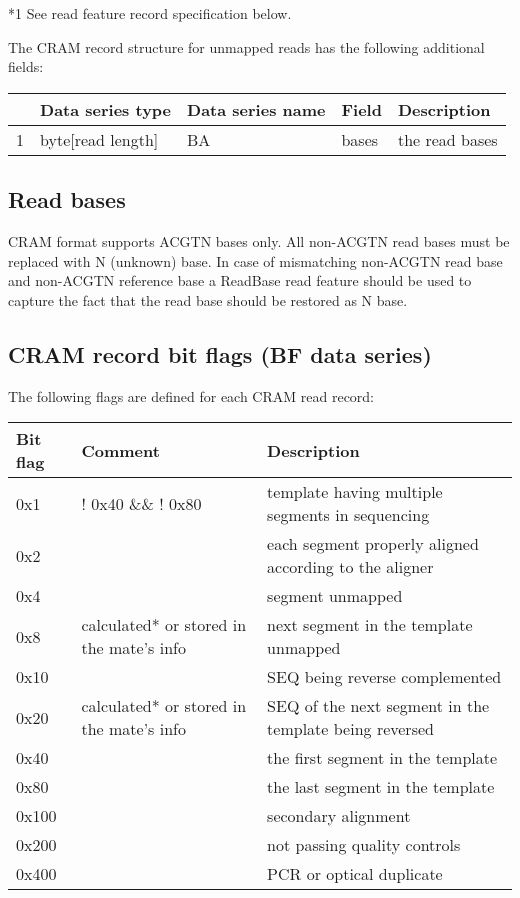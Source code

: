 \documentclass[a4paper]{article}
\begin{document}
*1 See read feature record specification below.

The CRAM record structure for unmapped reads has the following additional fields:

\begin{tabular}{|>{\raggedright}p{8pt}|>{\raggedright}p{88pt}|>{\raggedright}p{83pt}|>{\raggedright}p{85pt}|>{\raggedright}p{178pt}|}
\hline
 & \textbf{Data series type} & \textbf{Data series name} & \textbf{Field} & \textbf{Description}\tabularnewline
\hline
1 & byte[read length] & BA & bases & the read bases\tabularnewline
\hline
\end{tabular}

\subsection{\textbf{Read bases}}

CRAM format supports ACGTN bases only. All non-ACGTN read bases must be replaced 
with N (unknown) base. In case of mismatching non-ACGTN read base and non-ACGTN 
reference base a ReadBase read feature should be used to capture the fact that 
the read base should be restored as N base. 

\subsection{\textbf{CRAM record bit flags (BF data series)}}

The following flags are defined for each CRAM read record:

\begin{tabular}{|>{\raggedright}p{144pt}|>{\raggedright}p{144pt}|>{\raggedright}p{144pt}|}
\hline
\textbf{Bit flag} & \textbf{Comment} & \textbf{Description}\tabularnewline
\hline
0x1 & ! 0x40 \&\& ! 0x80 & template having multiple segments in sequencing\tabularnewline
\hline
0x2 &  & each segment properly aligned according to the aligner\tabularnewline
\hline
0x4 &  & segment unmapped\tabularnewline
\hline
0x8 & calculated* or stored in the mate's info & next segment in the template unmapped\tabularnewline
\hline
0x10 &  & SEQ being reverse complemented\tabularnewline
\hline
0x20 & calculated* or stored in the mate's info & SEQ of the next segment in the 
template being reversed\tabularnewline
\hline
0x40 &  & the first segment in the template\tabularnewline
\hline
0x80 &  & the last segment in the template\tabularnewline
\hline
0x100 &  & secondary alignment\tabularnewline
\hline
0x200 &  & not passing quality controls\tabularnewline
\hline
0x400 &  & PCR or optical duplicate\tabularnewline
\hline
\end{tabular}
\end{document}
